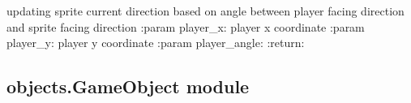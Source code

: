 \documentclass[letterpaper,10pt,english]{sphinxmanual}
\begin{document}
\begin{fulllineitems}
\begin{fulllineitems}
\end{fulllineitems}


\begin{fulllineitems}
\label{\detokenize{objects:objects.DirectionalSprite.DirectionalSprite.update}}
\pysigstartsignatures
{}
\pysigstopsignatures
\sphinxAtStartPar
updating sprite current direction based on angle between player facing direction and sprite facing direction
:param player\_x: player x coordinate
:param player\_y: player y coordinate
:param player\_angle:
:return:

\end{fulllineitems}


\end{fulllineitems}



\subsection{objects.GameObject module}
\label{\detokenize{objects:module-objects.GameObject}}\label{\detokenize{objects:objects-gameobject-module}}
\end{document}
